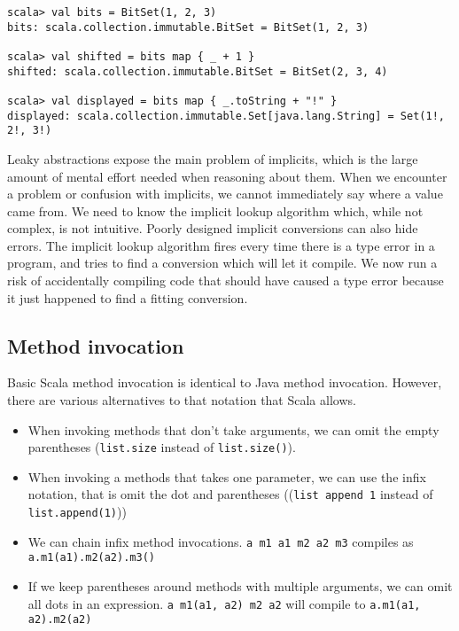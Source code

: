 \begin{lstlisting}[caption=Bitset example, label=code:bitset]
scala> val bits = BitSet(1, 2, 3)
bits: scala.collection.immutable.BitSet = BitSet(1, 2, 3)

scala> val shifted = bits map { _ + 1 }
shifted: scala.collection.immutable.BitSet = BitSet(2, 3, 4)

scala> val displayed = bits map { _.toString + "!" }
displayed: scala.collection.immutable.Set[java.lang.String] = Set(1!, 2!, 3!)
\end{lstlisting}

Leaky abstractions expose the main problem of implicits, which is the large amount of mental effort needed when reasoning about them. When we encounter a problem or confusion with implicits, we cannot immediately say where a value came from. We need to know the implicit lookup algorithm which, while not complex, is not intuitive. Poorly designed implicit conversions can also hide errors. The implicit lookup algorithm fires every time there is a type error in a program, and tries to find a conversion which will let it compile. We now run a risk of accidentally compiling code that should have caused a type error because it just happened to find a fitting conversion.

\subsection{Method invocation}

Basic Scala method invocation is identical to Java method invocation. However, there are various alternatives to that notation that Scala allows.

\begin{itemize}
	\item When invoking methods that don't take arguments, we can omit the empty parentheses (\texttt{list.size} instead of \texttt{list.size()}).
	\item When invoking a methods that takes one parameter, we can use the infix notation, that is omit the dot and parentheses ((\texttt{list append 1} instead of \texttt{list.append(1)}))
	\item We can chain infix method invocations. \texttt{a m1 a1 m2 a2 m3} compiles as\\ \texttt{a.m1(a1).m2(a2).m3()}
	\item If we keep parentheses around methods with multiple arguments, we can omit all dots in an expression. \texttt{a m1(a1, a2) m2 a2} will compile to \texttt{a.m1(a1, a2).m2(a2)}
\end{itemize}

